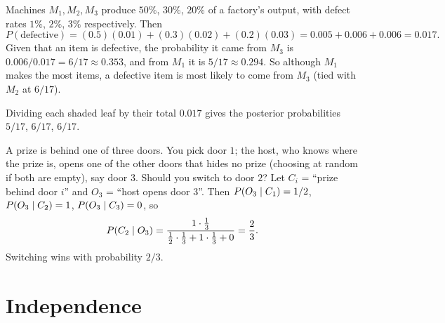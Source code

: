\begin{example}
Machines $M_1, M_2, M_3$ produce $50\%$, $30\%$, $20\%$ of a factory's output, with defect
rates $1\%$, $2\%$, $3\%$ respectively. Then
\[
  P(\text{defective}) = (0.5)(0.01) + (0.3)(0.02) + (0.2)(0.03) = 0.005 + 0.006 + 0.006
  = 0.017.
\]
Given that an item is defective, the probability it came from $M_3$ is
$0.006/0.017 = 6/17 \approx 0.353$, and from $M_1$ it is $5/17 \approx 0.294$. So
although $M_1$ makes the most items, a defective item is most likely to come from $M_3$
(tied with $M_2$ at $6/17$).
\end{example}

\begin{center}
\end{center}
Dividing each shaded leaf by their total $0.017$ gives the posterior probabilities
$5/17$, $6/17$, $6/17$.

\begin{example}
A prize is behind one of three doors. You pick door $1$; the host, who knows where the
prize is, opens one of the other doors that hides no prize (choosing at random if both
are empty), say door $3$. Should you switch to door $2$? Let $C_i$ = ``prize behind door
$i$'' and $O_3$ = ``host opens door $3$''. Then $P(O_3\mid C_1) = 1/2$,
$P(O_3\mid C_2) = 1$, $P(O_3\mid C_3) = 0$, so
\[
  P(C_2\mid O_3) = \frac{1\cdot\frac13}{\frac12\cdot\frac13 + 1\cdot\frac13 + 0} =
  \frac{2}{3}.
\]
Switching wins with probability $2/3$.
\end{example}

\section{Independence}

